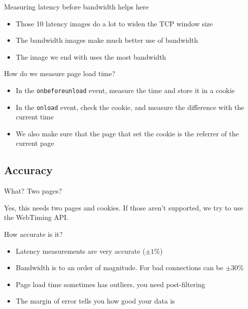 \documentclass{beamer}
\begin{document}
\begin{frame}{Measuring latency before bandwidth helps here}
  \begin{itemize}
  \item Those 10 latency images do a lot to widen the TCP window size
  \item The bandwidth images make much better use of bandwidth
  \item The image we end with uses the most bandwidth
  \end{itemize}
\end{frame}

\begin{frame}{How do we measure page load time?}
  \begin{itemize}
  \item In the \texttt{onbeforeunload} event, measure the time and store it in a cookie
  \item In the \texttt{onload} event, check the cookie, and measure the difference with the current time
  \item We also make sure that the page that set the cookie is the referrer of the current page
  \end{itemize}
\end{frame}

\subsection{Accuracy}

\begin{frame}{What? Two pages?}
  \begin{center}
  Yes, this needs two pages and cookies.  If those aren't supported, we try to use the WebTiming API.
  \end{center}
\end{frame}

\begin{frame}{How accurate is it?}
  \begin{itemize}
  \item Latency measurements are very accurate (\(\pm 1\%\))
  \item Bandwidth is to an order of magnitude. For bad connections can be \(\pm 30\%\)
  \item Page load time sometimes has outliers, you need post-filtering
  \item The margin of error tells you how good your data is
  \end{itemize}
\end{frame}
\end{document}
